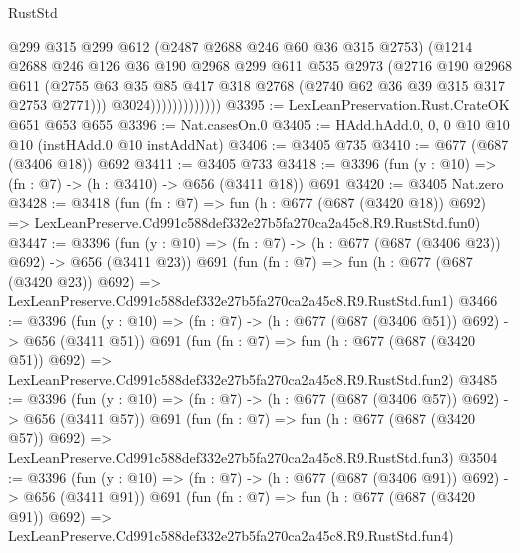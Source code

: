 \begin{lexlean}{RustStd}
\begin{coremodule}
                            @299
                            @315
                            @299
                            @612
                            (@2487 @2688 @246 @60 @36 @315 @2753)
                            (@1214
                              @2688
                              @246
                              @126
                              @36
                              @190
                              @2968
                              @299
                              @611
                              @535
                              @2973
                              (@2716
                                @190
                                @2968
                                @611
                                (@2755
                                  @63
                                  @35
                                  @85
                                  @417
                                  @318
                                  @2768
                                  (@2740 @62 @36 @39 @315 @317 @2753 @2771)))
                              @3024)))))))))))))
@3395 := LexLeanPreservation.Rust.CrateOK @651 @653 @655
@3396 := Nat.casesOn.{0}
@3405 := HAdd.hAdd.{0, 0, 0} @10 @10 @10 (instHAdd.{0} @10 instAddNat)
@3406 := @3405 @735
@3410 := @677 (@687 (@3406 @18)) @692
@3411 := @3405 @733
@3418 := @3396 (fun (y : @10) => (fn : @7) -> (h : @3410) -> @656 (@3411 @18)) @691
@3420 := @3405 Nat.zero
@3428 := @3418
    (fun (fn : @7) =>
    fun (h : @677 (@687 (@3420 @18)) @692) =>
    LexLeanPreserve.Cd991c588def332e27b5fa270ca2a45c8.R9.RustStd.fun0)
@3447 := @3396
    (fun (y : @10) => (fn : @7) -> (h : @677 (@687 (@3406 @23)) @692) -> @656 (@3411 @23))
    @691
    (fun (fn : @7) =>
    fun (h : @677 (@687 (@3420 @23)) @692) =>
    LexLeanPreserve.Cd991c588def332e27b5fa270ca2a45c8.R9.RustStd.fun1)
@3466 := @3396
    (fun (y : @10) => (fn : @7) -> (h : @677 (@687 (@3406 @51)) @692) -> @656 (@3411 @51))
    @691
    (fun (fn : @7) =>
    fun (h : @677 (@687 (@3420 @51)) @692) =>
    LexLeanPreserve.Cd991c588def332e27b5fa270ca2a45c8.R9.RustStd.fun2)
@3485 := @3396
    (fun (y : @10) => (fn : @7) -> (h : @677 (@687 (@3406 @57)) @692) -> @656 (@3411 @57))
    @691
    (fun (fn : @7) =>
    fun (h : @677 (@687 (@3420 @57)) @692) =>
    LexLeanPreserve.Cd991c588def332e27b5fa270ca2a45c8.R9.RustStd.fun3)
@3504 := @3396
    (fun (y : @10) => (fn : @7) -> (h : @677 (@687 (@3406 @91)) @692) -> @656 (@3411 @91))
    @691
    (fun (fn : @7) =>
    fun (h : @677 (@687 (@3420 @91)) @692) =>
    LexLeanPreserve.Cd991c588def332e27b5fa270ca2a45c8.R9.RustStd.fun4)

\end{coremodule}
\end{lexlean}
